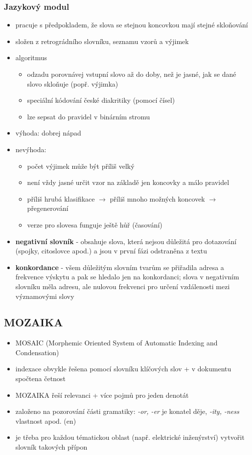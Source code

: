 \documentclass[a4paper]{article}
\newcommand{\imwc}[2]{\textbf{#1} - #2}
\begin{document}
\subsubsection*{Jazykový modul}
\begin{itemize}
\item pracuje s předpokladem, že slova se stejnou koncovkou mají stejné skloňování
\item složen z retrográdního slovníku, seznamu vzorů a výjimek
\item algoritmus 
\begin{itemize}
\item odzadu porovnávej vstupní slovo až do doby, než je jasné, jak se dané slovo skloňuje (popř. výjimka)
\item speciální kódování české diakritiky (pomocí čísel)
\item lze sepsat do pravidel v binárním stromu
\end{itemize}
\item výhoda: dobrej nápad
\item nevýhoda:
\begin{itemize}
\item počet výjimek může být příliš velký
\item není vždy jasné určit vzor na základě jen koncovky a málo pravidel
\item příliš hrubá klasifikace $\rightarrow$ příliš mnoho možných koncovek $\rightarrow$ přegenerování
\item verze pro slovesa funguje ještě hůř (časování)
\end{itemize}
\item \imwc{negativní slovník}{obsahuje slova, která nejsou důležitá pro dotazování (spojky, citoslovce apod.) a jsou v první fázi odstraněna z textu}
\item \imwc{konkordance}{všem důležitým slovním tvarům se přiřadila adresa a frekvence výskytu a pak se hledalo jen na konkordanci; slova v negativním slovníku měla adresu, ale nulovou frekvenci pro určení vzdálenosti mezi významovými slovy}
\end{itemize}

\subsection*{MOZAIKA}
\begin{itemize}
\item MOSAIC (Morphemic Oriented System of Automatic Indexing and Condensation)
\item indexace obvykle řešena pomocí slovníku klíčových slov + v dokumentu spočtena četnost
\item MOZAIKA řeší relevanci + více pojmů pro jeden denotát
\item založeno na pozorování části gramatiky: \textit{-or, -er} je konatel děje, \textit{-ity, -ness} vlastnost apod. (en)
\item je třeba pro každou tématickou oblast (např. elektrické inženýrství) vytvořit slovník takových přípon
\end{itemize}
\end{document}
